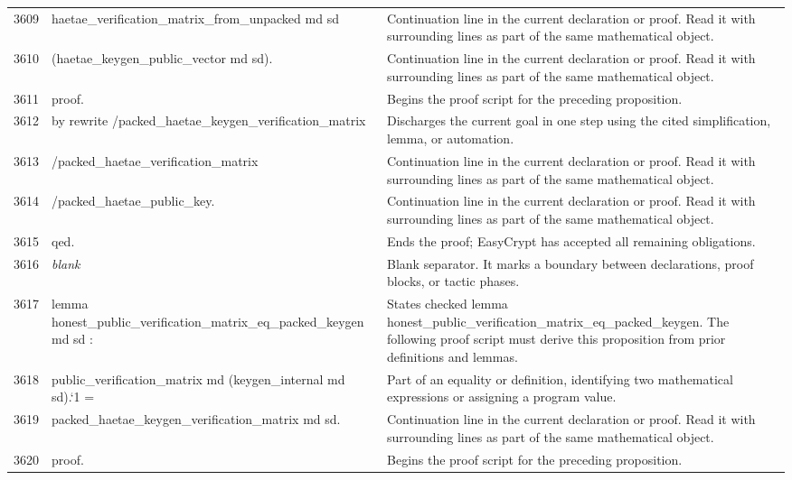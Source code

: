\documentclass[10pt]{article}
\begin{document}
\begin{longtable}{r L{0.53\textwidth} L{0.37\textwidth}}
3609 & {\ttfamily\scriptsize   haetae\_verification\_matrix\_from\_unpacked md sd} & Continuation line in the current declaration or proof.  Read it with surrounding lines as part of the same mathematical object. \\
3610 & {\ttfamily\scriptsize     (haetae\_keygen\_public\_vector md sd).} & Continuation line in the current declaration or proof.  Read it with surrounding lines as part of the same mathematical object. \\
3611 & {\ttfamily\scriptsize proof.} & Begins the proof script for the preceding proposition. \\
3612 & {\ttfamily\scriptsize by rewrite /packed\_haetae\_keygen\_verification\_matrix} & Discharges the current goal in one step using the cited simplification, lemma, or automation. \\
3613 & {\ttfamily\scriptsize            /packed\_haetae\_verification\_matrix} & Continuation line in the current declaration or proof.  Read it with surrounding lines as part of the same mathematical object. \\
3614 & {\ttfamily\scriptsize            /packed\_haetae\_public\_key.} & Continuation line in the current declaration or proof.  Read it with surrounding lines as part of the same mathematical object. \\
3615 & {\ttfamily\scriptsize qed.} & Ends the proof; EasyCrypt has accepted all remaining obligations. \\
3616 & {\ttfamily\scriptsize \emph{blank}} & Blank separator.  It marks a boundary between declarations, proof blocks, or tactic phases. \\
3617 & {\ttfamily\scriptsize lemma honest\_public\_verification\_matrix\_eq\_packed\_keygen md sd :} & States checked lemma honest\_public\_verification\_matrix\_eq\_packed\_keygen.  The following proof script must derive this proposition from prior definitions and lemmas. \\
3618 & {\ttfamily\scriptsize   public\_verification\_matrix md (keygen\_internal md sd).`1 =} & Part of an equality or definition, identifying two mathematical expressions or assigning a program value. \\
3619 & {\ttfamily\scriptsize   packed\_haetae\_keygen\_verification\_matrix md sd.} & Continuation line in the current declaration or proof.  Read it with surrounding lines as part of the same mathematical object. \\
3620 & {\ttfamily\scriptsize proof.} & Begins the proof script for the preceding proposition. \\

\end{longtable}
\end{document}
